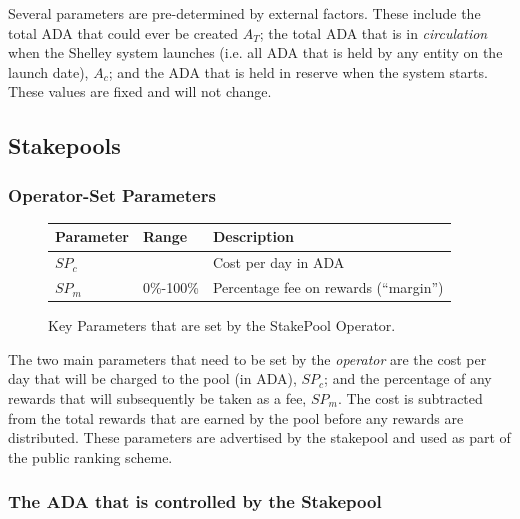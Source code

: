 \documentclass[11pt,a4paper,dvipsnames,twosided]{article}
\newcommand{\ada}{ADA{}}
\begin{document}
\noindent
Several parameters are pre-determined by external factors. These include the
total \ada{} that could ever be created $A_T$;
the total \ada{} that is in \emph{circulation} when the Shelley system launches
(i.e. all \ada{} that is held by any entity on the launch date), $A_c$;
and the \ada{} that is held in reserve when the system starts.
These values are fixed and will not change.

\clearpage
\subsection{Stakepools}

\subsubsection*{Operator-Set Parameters}

\begin{figure}[h!]
\begin{center}
\begin{tabular}{||l|p{6cm}|l||}
  \hline \hline
\textbf{Parameter} & \textbf{Range} & \textbf{Description} \\\hline
$SP_c$ &  & Cost per day in \ada{} \\\hline
$SP_m$ &  0\%-100\% & Percentage fee on rewards (``margin'') \\\hline
\end{tabular}
\end{center}
\caption{Key Parameters that are set by the StakePool Operator.}
\end{figure}

\noindent
The two main parameters that need to be set by the \emph{operator} are the cost per day that will be charged to
the pool (in \ada), $SP_c$; and the percentage of any rewards that will subsequently be taken as a fee, $SP_m$.
The cost is subtracted from the total rewards that are earned by the pool before any rewards are distributed.
These parameters are advertised by the stakepool and used as part of the public ranking scheme.

\subsubsection*{The \ada{} that is controlled by the Stakepool}
\end{document}
